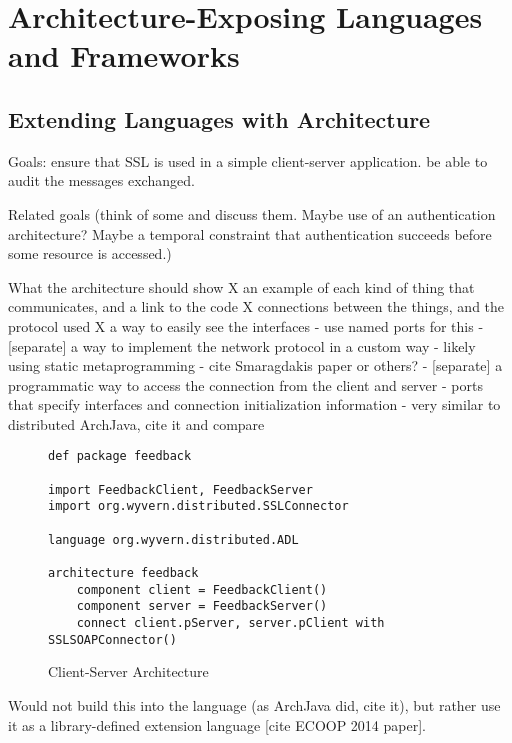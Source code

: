\documentclass[runningheads]{llncs}
\begin{document}
\begin{sloppypar}
\section{Architecture-Exposing Languages and Frameworks}

\subsection{Extending Languages with Architecture}

Goals: ensure that SSL is used in a simple client-server application.  be able to audit the messages exchanged.

Related goals (think of some and discuss them.  Maybe use of an authentication architecture?  Maybe a temporal constraint that authentication succeeds before some resource is accessed.)

What the architecture should show
 X an example of each kind of thing that communicates, and a link to the code
 X connections between the things, and the protocol used
 X a way to easily see the interfaces
   - use named ports for this
 - [separate] a way to implement the network protocol in a custom way
   - likely using static metaprogramming
   - cite Smaragdakis paper or others?
 - [separate] a programmatic way to access the connection from the client and server
   - ports that specify interfaces and connection initialization information
   - very similar to distributed ArchJava, cite it and compare

\clearpage
   
\begin{figure}[t]
\begin{lstlisting}
def package feedback

import FeedbackClient, FeedbackServer
import org.wyvern.distributed.SSLConnector

language org.wyvern.distributed.ADL

architecture feedback
    component client = FeedbackClient()
    component server = FeedbackServer()
    connect client.pServer, server.pClient with SSLSOAPConnector()
\end{lstlisting}
\caption{Client-Server Architecture}
\label{f-architecture}
\end{figure}

Would not build this into the language (as ArchJava did, cite it), but rather use it as a library-defined extension language [cite ECOOP 2014 paper].


\end{sloppypar}
\end{document}
